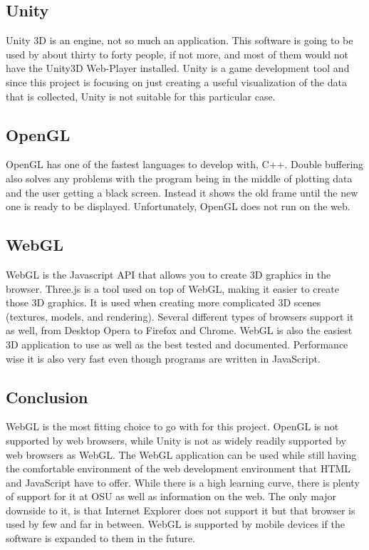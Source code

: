 \documentclass[10pt,draftclsnofoot,onecolumn]{IEEEtran}
\begin{document}
	\subsection{Unity}
	Unity 3D is an engine, not so much an application. 
	This software is going to be used by about thirty to forty people, if not more, and most of them would not have the
	Unity3D Web-Player installed. 
	Unity is a game development tool and since this project is focusing on just creating a useful visualization of the 
	data that is collected, Unity is not suitable for this particular case.
	
	\subsection{OpenGL}
	OpenGL has one of the fastest languages to develop with, C++. 
	Double buffering also solves any problems with the program being in the middle of plotting data and the user getting
	a black screen. 
	Instead it shows the old frame until the new one is ready to be displayed. 
	Unfortunately, OpenGL does not run on the web.
	
	\subsection{WebGL}
	WebGL is the Javascript API that allows you to create 3D graphics in the browser. 
	Three.js is a tool used on top of WebGL, making it easier to create those 3D graphics. 
	It is used when creating more complicated 3D scenes (textures, models, and rendering). 
	Several different types of browsers support it as well, from Desktop Opera to Firefox and Chrome. 
	WebGL is also the easiest 3D application to use as well as the best tested and documented. 
	Performance wise it is also very fast even though programs are written in JavaScript. 
	
	\subsection{Conclusion}
	WebGL is the most fitting choice to go with for this project.
	OpenGL is not supported by web browsers, while Unity is not as widely readily supported by web browsers as WebGL.
	The WebGL application can be used while still having the comfortable environment of the web development
	environment that HTML and JavaScript have to offer. 
	While there is a high learning curve, there is plenty of support for it at OSU as well as information on the web.
	The only major downside to it, is that Internet Explorer does not support it but that browser is used by few and 
	far in between. 
	WebGL is supported by mobile devices if the software is expanded to them in the future.
	
\end{document}
